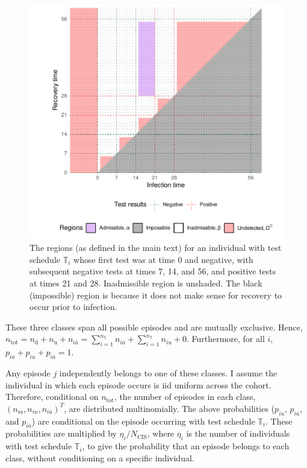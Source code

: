 \documentclass[12pt, letterpaper]{article} %
\newcommand{\ntot}{n_\text{tot}}
\newcommand{\ndet}{n_\text{d}}
\newcommand{\nnodet}{n_\text{u}}
\newcommand{\Ncis}{N_\text{CIS}}
\newcommand{\sched}{\mathbb{T}}
\newcommand{\nsched}{n_{\sched}}
\begin{document}
\begin{figure}
\includegraphics[width=\textwidth]{cis-perfect-testing/regions_diag}
\caption[Admissible, inadmissible, and undetected infections]{The regions (as defined in the main text) for an individual with test schedule $\sched_i$ whose first test was at time 0 and negative, with subsequent
negative tests at times 7, 14, and 56, and positive tests at times 21
and 28. Inadmissible region is unshaded. The black (impossible) region is because it does not make sense for recovery to occur prior to infection. \label{perf-test:fig:partitionSpace}}
\end{figure}

These three classes span all possible episodes and are mutually exclusive.
Hence, $\ntot = \ndet + \nnodet + n_{i\bar{a}} = \sum_{i=1}^{\nsched} n_{ia} + \sum_{i=1}^{\nsched} n_{iu} + 0$.
Furthermore, for all $i$, $p_{ia} + p_{iu} + p_{i\bar{a}} = 1$.

Any episode $j$ independently belongs to one of these classes.
I assume the individual in which each episode occurs is iid uniform across the cohort.
Therefore, conditional on $\ntot$, the number of episodes in each class, $(n_{ia}, n_{iu}, n_{i\bar{a}})^T$, are distributed multinomially.
The above probabilities ($p_{iu}$, $p_{ia}$, and $p_{i\bar{a}}$) are conditional on the episode occurring with test schedule $\sched_i$.
These probabilities are multiplied by $\eta_i/\Ncis$, where $\eta_i$ is the number of individuals with test schedule $\sched_i$, to give the probability that an episode belongs to each class, without conditioning on a specific individual.
\end{document}
